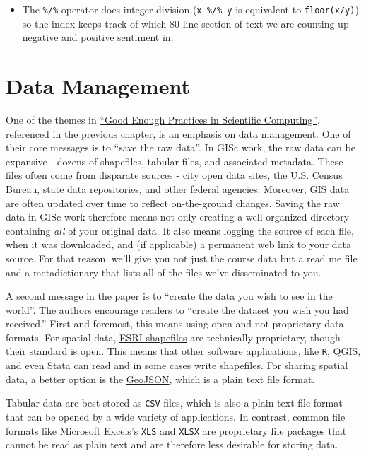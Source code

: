\documentclass[]{book}
\newenvironment{rmdblock}[1]
  {\begin{shaded*}
  \begin{itemize}
  \renewcommand{\labelitemi}{
    \raisebox{-.7\height}[0pt][0pt]{
      {\setkeys{Gin}{width=3em,keepaspectratio}\texttt{[image: images/\#1]}}
    }
  }
  \item
  }
  {
  \end{itemize}
  \end{shaded*}
  }
\newenvironment{rmdtip}
  {\begin{rmdblock}{tip}}
  {\end{rmdblock}}
\theoremstyle{definition}
\theoremstyle{definition}
\theoremstyle{definition}
\theoremstyle{remark}
\begin{document}
\begin{rmdtip}
The \texttt{\%/\%} operator does integer division (\texttt{x\ \%/\%\ y}
is equivalent to \texttt{floor(x/y)}) so the index keeps track of which
80-line section of text we are counting up negative and positive
sentiment in.
\end{rmdtip}

\section{Data Management}\label{data-management}

One of the themes in \href{https://arxiv.org/abs/1609.00037}{``Good
Enough Practices in Scientific Computing''}, referenced in the previous
chapter, is an emphasis on data management. One of their core messages
is to ``save the raw data''. In GISc work, the raw data can be expansive
- dozens of shapefiles, tabular files, and associated metadata. These
files often come from disparate sources - city open data sites, the U.S.
Census Bureau, state data repositories, and other federal agencies.
Moreover, GIS data are often updated over time to reflect on-the-ground
changes. Saving the raw data in GISc work therefore means not only
creating a well-organized directory containing \emph{all} of your
original data. It also means logging the source of each file, when it
was downloaded, and (if applicable) a permanent web link to your data
source. For that reason, we'll give you not just the course data but a
read me file and a metadictionary that lists all of the files we've
disseminated to you.

A second message in the paper is to ``create the data you wish to see in
the world''. The authors encourage readers to ``create the dataset you
wish you had received.'' First and foremost, this means using open and
not proprietary data formats. For spatial data,
\href{https://en.wikipedia.org/wiki/Shapefile}{ESRI shapefiles} are
technically proprietary, though their standard is open. This means that
other software applications, like \texttt{R}, QGIS, and even Stata can
read and in some cases write shapefiles. For sharing spatial data, a
better option is the
\href{https://en.wikipedia.org/wiki/GeoJSON}{GeoJSON}, which is a plain
text file format.

Tabular data are best stored as \texttt{CSV} files, which is also a
plain text file format that can be opened by a wide variety of
applications. In contrast, common file formats like Microsoft Excels's
\texttt{XLS} and \texttt{XLSX} are proprietary file packages that cannot
be read as plain text and are therefore less desirable for storing data.
\end{document}
